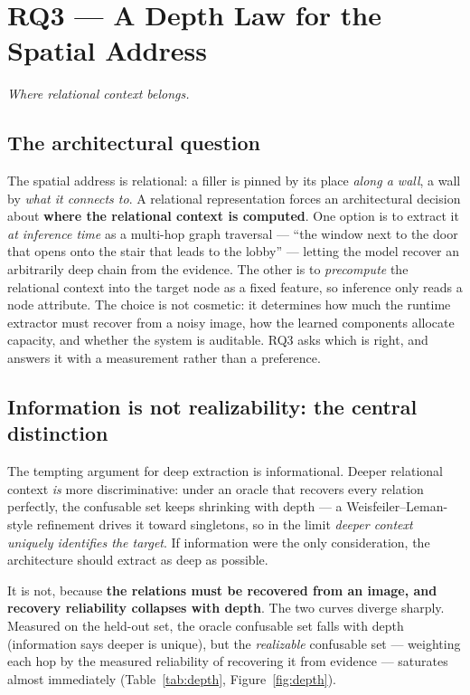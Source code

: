 \chapter{RQ3 --- A Depth Law for the Spatial Address}
\label{ch:rq3}

\emph{Where relational context belongs.}

\section{The architectural question}

The spatial address is relational: a filler is pinned by its place \emph{along a wall}, a wall by
\emph{what it connects to}. A relational representation forces an architectural decision about
\textbf{where the relational context is computed}. One option is to extract it \emph{at inference time}
as a multi-hop graph traversal --- ``the window next to the door that opens onto the stair that leads
to the lobby'' --- letting the model recover an arbitrarily deep chain from the evidence. The other is
to \emph{precompute} the relational context into the target node as a fixed feature, so inference only
reads a node attribute. The choice is not cosmetic: it determines how much the runtime extractor must
recover from a noisy image, how the learned components allocate capacity, and whether the system is
auditable. RQ3 asks which is right, and answers it with a measurement rather than a preference.

\section{Information is not realizability: the central distinction}

The tempting argument for deep extraction is informational. Deeper relational context \emph{is} more
discriminative: under an oracle that recovers every relation perfectly, the confusable set keeps
shrinking with depth --- a Weisfeiler--Leman-style refinement drives it toward singletons, so in the
limit \emph{deeper context uniquely identifies the target}. If information were the only consideration,
the architecture should extract as deep as possible.

It is not, because \textbf{the relations must be recovered from an image, and recovery reliability
collapses with depth}. The two curves diverge sharply. Measured on the held-out set, the oracle
confusable set falls with depth (information says deeper is unique), but the \emph{realizable}
confusable set --- weighting each hop by the measured reliability of recovering it from evidence ---
saturates almost immediately (Table~\ref{tab:depth}, Figure~\ref{fig:depth}).

